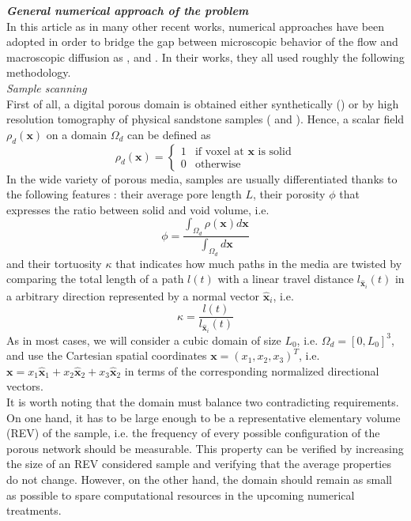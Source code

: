 \textbf{\textit{General numerical approach of the problem}}\\
In this article as in many other recent works, numerical approaches have been adopted in order to bridge the gap between microscopic behavior of the flow and macroscopic diffusion as \citet{Meyer2016}, \citet{Dentz2017} and \citet{Puyguiraud2019}. In their works, they all used roughly the following methodology.\\
\textit{Sample scanning}\\
First of all, a digital porous domain is obtained either synthetically (\cite{Dentz2017}) or by high resolution tomography of physical sandstone samples (\cite{Meyer2016} and \cite{Puyguiraud2019}).
Hence, a scalar field  $\rho_d(\textbf{x})$ on a domain $\Omega_d$ can be defined as 
\[
\rho_d(\textbf{x})=\left\{
\begin{array}{ll}
1 &  \textrm{if voxel at $\textbf{x}$ is solid} \\
0 & \textrm{otherwise}
\end{array} 
\right.
\]
In the wide variety of porous media, samples are usually differentiated thanks to the following features : their average pore length $L$, their porosity $\phi$ that expresses the ratio between solid and void volume, i.e.
\[
\phi = \frac{\int_{\Omega_d}\rho(\textbf{x})d\textbf{x}}{\int_{\Omega_d}d\textbf{x}}
\] 
and their tortuosity $\kappa$ that indicates how much paths in the media are twisted by comparing the total length of a path $l(t)$ with a linear travel distance $l_{\hat{\textbf{x}}_i}(t)$ in a arbitrary direction represented by a normal vector $\hat{\textbf{x}}_i$, i.e. 
\[
\kappa = \frac{l(t)}{l_{\hat{\textbf{x}}_i}(t)}
\] 
As in most cases, we will consider a cubic domain of size $L_0$, i.e. $\Omega_d=[0,L_0]^3$, and use the Cartesian spatial coordinates $\textbf{x}=(x_1,x_2,x_3)^T$, i.e. $\textbf{x}=x_1\hat{\textbf{x}}_1+x_2\hat{\textbf{x}}_2+x_3\hat{\textbf{x}}_2$ in terms of the corresponding normalized directional vectors.\\
It is worth noting that the domain must balance two contradicting requirements. On one hand, it has to be large enough to be a representative elementary volume (REV) of the sample, i.e. the frequency of every possible configuration of the porous network should be measurable.
This property can be verified by increasing the size of an REV considered sample and verifying that the average properties do not change.
However, on the other hand, the domain should remain as small as possible to spare computational resources in the upcoming numerical treatments.\\
